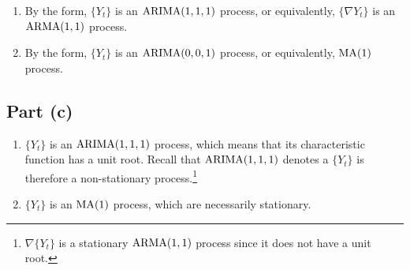 \documentclass[
]{article}
\begin{document}

\begin{enumerate}
\item[(i)] By the form, $\{Y_t\}$ is an $\operatorname{ARIMA}(1,1,1)$ process, or equivalently,
$\{\nabla Y_t\}$ is an $\operatorname{ARMA}(1,1)$ process.
\item[(ii)] By the form, $\{Y_t\}$ is an $\operatorname{ARIMA}(0,0,1)$ process, or equivalently, $\operatorname{MA}(1)$ process.
\end{enumerate}

\hypertarget{part-c}{%
\subsection{Part (c)}\label{part-c}}


\begin{enumerate}
\item[(i)] $\{Y_t\}$ is an $\operatorname{ARIMA}(1,1,1)$ process, which means that its characteristic function has a unit root.
Recall that $\operatorname{ARIMA}(1,1,1)$ denotes a 
$\{Y_t\}$ is therefore a non-stationary process.\footnote{$\nabla \{Y_t\}$ is a stationary $\operatorname{ARMA}(1,1)$ process since it does not have a unit root.}
\item[(ii)] $\{Y_t\}$ is an $\operatorname{MA}(1)$ process, which are necessarily stationary.
\end{enumerate}
\end{document}
